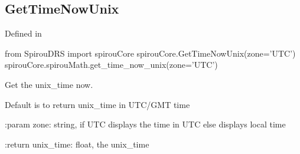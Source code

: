 \noindent\begin{minipage}{\textwidth}
\subsection{GetTimeNowUnix}

Defined in \spirouCore{}

\begin{pythonbox}
from SpirouDRS import spirouCore
spirouCore.GetTimeNowUnix(zone='UTC')
spirouCore.spirouMath.get_time_now_unix(zone='UTC')
\end{pythonbox}

\begin{pythondocstring}
Get the unix_time now.

Default is to return unix_time in UTC/GMT time

:param zone: string, if UTC displays the time in UTC else displays local
             time

:return unix_time: float, the unix_time
\end{pythondocstring}
\end{minipage}

